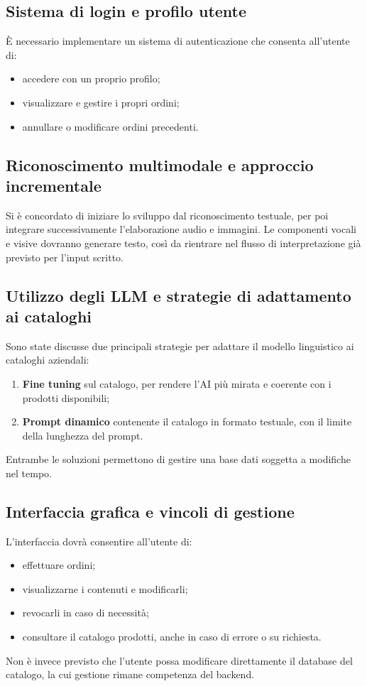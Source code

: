 \documentclass[a4paper,12pt]{article}
\begin{document}
\subsection{Sistema di login e profilo utente}
È necessario implementare un sistema di autenticazione che consenta all’utente di:
\begin{itemize}
    \item accedere con un proprio profilo;
    \item visualizzare e gestire i propri ordini;
    \item annullare o modificare ordini precedenti.
\end{itemize}

\subsection{Riconoscimento multimodale e approccio incrementale}
Si è concordato di iniziare lo sviluppo dal riconoscimento testuale, per poi integrare successivamente l’elaborazione audio e immagini.  
Le componenti vocali e visive dovranno generare testo, così da rientrare nel flusso di interpretazione già previsto per l’input scritto.

\subsection{Utilizzo degli LLM e strategie di adattamento ai cataloghi}
Sono state discusse due principali strategie per adattare il modello linguistico ai cataloghi aziendali:
\begin{enumerate}
    \item \textbf{Fine tuning} sul catalogo, per rendere l’AI più mirata e coerente con i prodotti disponibili;
    \item \textbf{Prompt dinamico} contenente il catalogo in formato testuale, con il limite della lunghezza del prompt.
\end{enumerate}
Entrambe le soluzioni permettono di gestire una base dati soggetta a modifiche nel tempo.

\subsection{Interfaccia grafica e vincoli di gestione}
L’interfaccia dovrà consentire all’utente di:
\begin{itemize}
    \item effettuare ordini;
    \item visualizzarne i contenuti e modificarli;
    \item revocarli in caso di necessità;
    \item consultare il catalogo prodotti, anche in caso di errore o su richiesta.
\end{itemize}
Non è invece previsto che l’utente possa modificare direttamente il database del catalogo, la cui gestione rimane competenza del backend.
\end{document}
